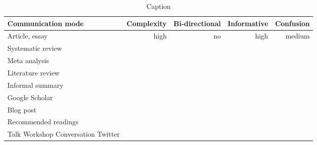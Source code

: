\begin{table*}\centering
{}
\begin{tabular}{@{}lrrrr@{}}\toprule
Communication mode & Complexity & Bi-directional & Informative  & Confusion
\\\midrule
Article, essay & high & no & high & medium  \\
Systematic review \\
Meta analysis \\
Literature review \\
Informal summary \\
Google Scholar \\
Blog post \\
Recommended readings \\
Talk
Workshop
Conversation
Twitter


\bottomrule
\end{tabular}
\caption{Caption}
\end{table*}